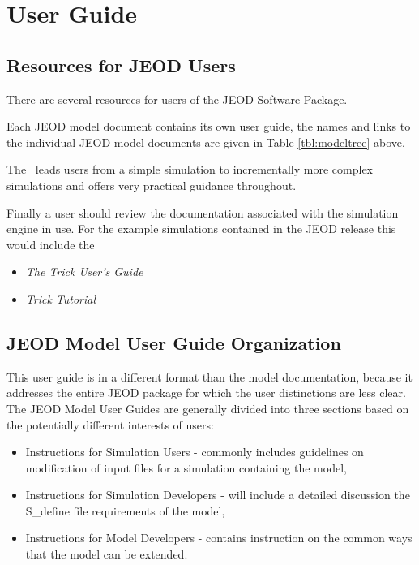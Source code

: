 %
%
%
%
% 
%

\chapter{User Guide}\label{ch:user}
\section{Resources for JEOD Users}
There are several resources for users of the JEOD Software Package.

Each JEOD model document contains its own user guide, the names and links to the individual JEOD model documents are given in Table \ref{tbl:modeltree} above.

The \hyperTutorial\ leads users from a simple simulation to incrementally more complex simulations and offers very practical guidance throughout.

Finally a user should review the documentation associated with the simulation engine in use.  For the example simulations contained in the JEOD release this would include the

\begin{itemize}
\item{\em The Trick User's Guide}
\cite{Vetter:TrickUser}

\item{\em Trick Tutorial}
\cite{Vetter:TrickTutorial}
\end{itemize}

\section{JEOD Model User Guide Organization}
This user guide is in a different format than the model documentation, because it addresses the entire JEOD package for which the user distinctions are less clear.  The JEOD Model User Guides are generally divided into three sections based on the potentially different interests of users:
\begin{itemize}
\item Instructions for Simulation Users - commonly includes guidelines on modification of input files for a simulation containing the model,
\item Instructions for Simulation Developers - will include a detailed discussion the S\_define file requirements of the model,
\item Instructions for Model Developers - contains instruction on the common ways that the model can be extended.
\end{itemize}

